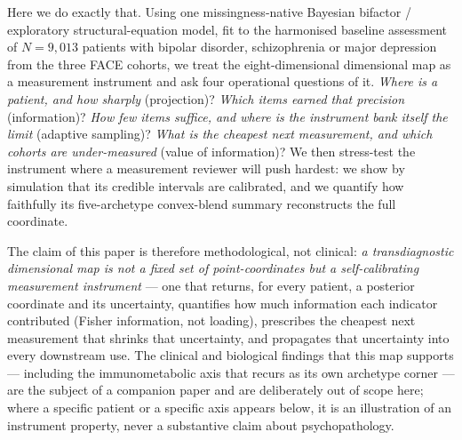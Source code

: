 Here we do exactly that. Using one missingness-native Bayesian bifactor /
exploratory structural-equation model, fit to the harmonised baseline assessment
of $N=9{,}013$ patients with bipolar disorder, schizophrenia or major depression
from the three FACE cohorts, we treat the eight-dimensional dimensional map as a
measurement instrument and ask four operational questions of it. \emph{Where is a
patient, and how sharply} (projection)? \emph{Which items earned that precision}
(information)? \emph{How few items suffice, and where is the instrument bank itself
the limit} (adaptive sampling)? \emph{What is the cheapest next measurement, and
which cohorts are under-measured} (value of information)? We then stress-test the
instrument where a measurement reviewer will push hardest: we show by simulation
that its credible intervals are calibrated, and we quantify how faithfully its
five-archetype convex-blend summary reconstructs the full coordinate.

The claim of this paper is therefore methodological, not clinical: \emph{a
transdiagnostic dimensional map is not a fixed set of point-coordinates but a
self-calibrating measurement instrument} --- one that returns, for every patient,
a posterior coordinate and its uncertainty, quantifies how much information each
indicator contributed (Fisher information, not loading), prescribes the cheapest
next measurement that shrinks that uncertainty, and propagates that uncertainty
into every downstream use. The clinical and biological findings that this map
supports --- including the immunometabolic axis that recurs as its own archetype
corner --- are the subject of a companion paper and are deliberately out of scope
here; where a specific patient or a specific axis appears below, it is an
illustration of an instrument property, never a substantive claim about
psychopathology.
